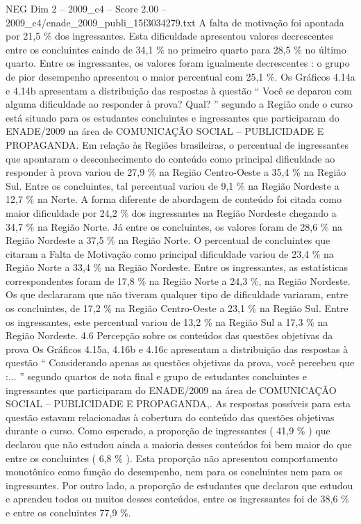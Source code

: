 \begin{textsample}{NEG Dim 2 – 2009\_c4 – Score 2.00 – 2009\_c4/enade\_2009\_publi\_15f3034279.txt}
A falta de motivação foi apontada por 21,5 \% dos ingressantes.
Esta dificuldade apresentou valores decrescentes entre os concluintes caindo de 34,1 \% no primeiro quarto para 28,5 \% no último quarto.
Entre os ingressantes, os valores foram igualmente decrescentes : o grupo de pior desempenho apresentou o maior percentual com 25,1 \%.
Os Gráficos 4.14a e 4.14b apresentam a distribuição das respostas à questão “ Você se deparou com alguma dificuldade ao responder à prova?
Qual? ” segundo a Região onde o curso está situado para os estudantes concluintes e ingressantes que participaram do ENADE/2009 na área de COMUNICAÇÃO SOCIAL – PUBLICIDADE E PROPAGANDA.
Em relação às Regiões brasileiras, o percentual de ingressantes que apontaram o desconhecimento do conteúdo como principal dificuldade ao responder à prova variou de 27,9 \% na Região Centro-Oeste a 35,4 \% na Região Sul.
Entre os concluintes, tal percentual variou de 9,1 \% na Região Nordeste a 12,7 \% na Norte.
A forma diferente de abordagem de conteúdo foi citada como maior dificuldade por 24,2 \% dos ingressantes na Região Nordeste chegando a 34,7 \% na Região Norte.
Já entre os concluintes, os valores foram de 28,6 \% na Região Nordeste a 37,5 \% na Região Norte.
O percentual de concluintes que citaram a Falta de Motivação como principal dificuldade variou de 23,4 \% na Região Norte a 33,4 \% na Região Nordeste.
Entre os ingressantes, as estatísticas correspondentes foram de 17,8 \% na Região Norte a 24,3 \%, na Região Nordeste.
Os que declararam que não tiveram qualquer tipo de dificuldade variaram, entre os concluintes, de 17,2 \% na Região Centro-Oeste a 23,1 \% na Região Sul.
Entre os ingressantes, este percentual variou de 13,2 \% na Região Sul a 17,3 \% na Região Nordeste. 4.6 Percepção sobre os conteúdos das questões objetivas da prova Os Gráficos 4.15a, 4.16b e 4.16c apresentam a distribuição das respostas à questão “ Considerando apenas as questões objetivas da prova, você percebeu que :... ” segundo quartos de nota final e grupo de estudantes concluintes e ingressantes que participaram do ENADE/2009 na área de COMUNICAÇÃO SOCIAL – PUBLICIDADE E PROPAGANDA,.
As respostas possíveis para esta questão estavam relacionadas à cobertura do conteúdo das questões objetivas durante o curso.
Como esperado, a proporção de ingressantes ( 41,9 \% ) que declarou que não estudou ainda a maioria desses conteúdos foi bem maior do que entre os concluintes ( 6,8 \% ).
Esta proporção não apresentou comportamento monotônico como função do desempenho, nem para os concluintes nem para os ingressantes.
Por outro lado, a proporção de estudantes que declarou que estudou e aprendeu todos ou muitos desses conteúdos, entre os ingressantes foi de 38,6 \% e entre os concluintes 77,9 \%.

\end{textsample}
